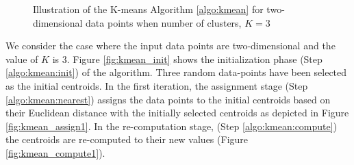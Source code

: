 \begin{figure}[h]
	\centerline{
	}
	\caption{Illustration of the K-means Algorithm \ref{algo:kmean} for two-dimensional data points when number of clusters, $K = 3$}
\label{fig:kmean}
\end{figure}

We consider the case where the input data points are two-dimensional and the value of $K$ is 3. Figure \ref{fig:kmean_init} shows the initialization phase (Step \ref{algo:kmean:init}) of the algorithm. Three random data-points have been selected as the initial centroids. In the first iteration, the assignment stage (Step \ref{algo:kmean:nearest}) assigns the data points to the initial centroids based on their Euclidean distance with the initially selected centroids as depicted in Figure \ref{fig:kmean_assign1}. In the re-computation stage, (Step \ref{algo:kmean:compute}) the centroids are re-computed to their new values (Figure \ref{fig:kmean_compute1}).


